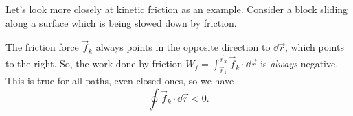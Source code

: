 \documentclass[../classical_mechanics.tex]{subfiles}
\begin{document}
        Let's look more closely at kinetic friction as an example.
        Consider a block sliding along a surface which is being slowed down by friction.
        \begin{figure}[H]
            \centering
        \end{figure}
        The friction force $\vec{f}_k$ always points in the opposite direction to $\dd{\vec{r}}$, which points to the right.
        So, the work done by friction $W_f=\int_{\vec{r}_1}^{\vec{r}_2}\vec{f}_k\cdot\dd{\vec{r}}$ is \textit{always} negative.
        This is true for all paths, even closed ones, so we have
        \begin{equation}
            \oint\vec{f}_k\cdot\dd{\vec{r}}<0.
        \end{equation}
\end{document}
